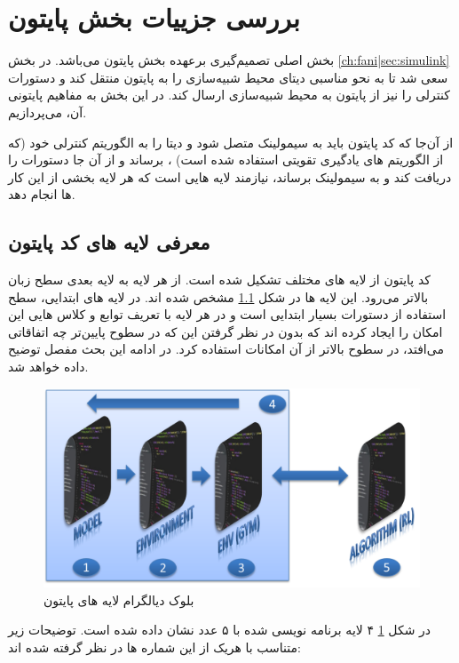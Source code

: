 \section{بررسی جزییات بخش پایتون}\label{ch:fani|sec:python}
بخش اصلی تصمیم‌گیری برعهده بخش پایتون می‌باشد. در بخش 
\ref{ch:fani|sec:simulink}
سعی شد تا به نحو مناسبی دیتای محیط شبیه‌سازی را به پایتون منتقل کند و دستورات کنترلی را نیز از پایتون به محیط شبیه‌سازی ارسال کند. در این بخش به مفاهیم پایتونی آن، می‌پردازیم.

از آن‌جا که کد پایتون باید به سیمولینک متصل شود و دیتا را به الگوریتم کنترلی خود (که از الگوریتم های یادگیری تقویتی استفاده شده است) ، برساند و از آن جا دستورات را دریافت کند و به سیمولینک برساند، نیازمند لایه هایی است که هر لایه بخشی از این کار ها انجام دهد.

\subsection{معرفی لایه های کد پایتون}\label{ch:fani|sec:python|sub:layers}
کد پایتون از لایه های مختلف تشکیل شده است. از هر لایه به لایه بعدی سطح زبان بالاتر می‌رود. این لایه ها در شکل 
\ref{ch:fani|sec:python|sub:layers}
مشخص شده اند. در لایه های ابتدایی، سطح استفاده از دستورات بسیار ابتدایی است و در هر لایه با تعریف توابع و کلاس هایی این امکان را ایجاد کرده اند که بدون در نظر گرفتن این که در سطوح پایین‌تر چه اتفاقاتی می‌افتد، در سطوح بالاتر از آن امکانات استفاده کرد. در ادامه این بحث مفصل توضیح داده خواهد شد.



\begin{figure}
	\centering
	\includegraphics[width=0.8\linewidth]{Figures/python-layers-white}
	\caption{بلوک دیالگرام لایه های پایتون}
	\label{fig:python-layers}
\end{figure}
در شکل 
\ref{fig:python-layers}
۴ لایه برنامه نویسی شده با ۵ عدد نشان داده شده است. توضیحات زیر متناسب با هر‌یک از این شماره ها در نظر گرفته شده اند:





